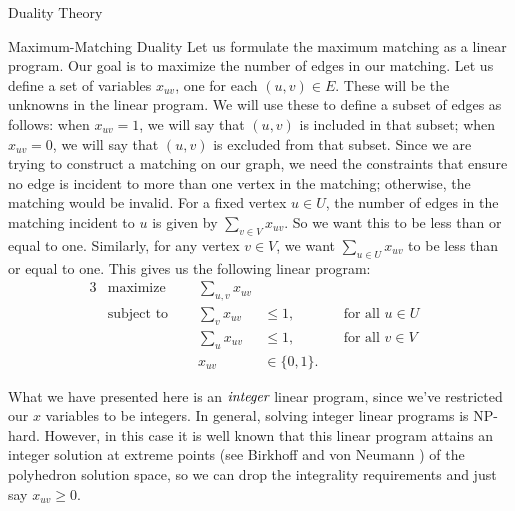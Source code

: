 \begin{section}{Duality Theory}
\begin{subsection}{Maximum-Matching Duality}
	Let us formulate the maximum matching as a linear program. Our goal is to maximize the number 
	of edges in our matching. Let us define a set of variables $x_{uv}$, one for each $(u,v)\in E$. 
	These will be the unknowns in the linear program. We will use these to define a subset of 
	edges as follows: when $x_{uv} = 1$, we will say that $(u,v)$ is included in that subset; 
	when $x_{uv} = 0$, we will say that $(u,v)$ is excluded from that subset. Since we are trying 
	to construct a matching on our graph, we need the constraints that ensure no edge is incident to 
	more than one vertex in the matching; otherwise, the matching would be invalid. For a fixed 
	vertex $u\in U$, the number of edges in the matching incident 
	to $u$ is given by $\sum_{v\in V} x_{uv}$. So we want this to be less than or equal to one. 
	Similarly, for any vertex $v\in V$, we want $\sum_{u\in U} x_{uv}$ to be less than or equal to 
	one. This gives us the following linear program:
	\begin{alignat}{3}
		& \text{maximize } & \sum_{u,v} x_{uv}& \\
		& \text{subject to } \quad & \sum_{v} x_{uv} & \leq 1, & \quad \text{for all } u\in U& \\
				     &\quad & \sum_{u} x_{uv} & \leq 1, & \quad \text{for all } v\in 
				     V & \\
				&& x_{uv} & \in \{0,1\}.
	\end{alignat}

	What we have presented here is an $\emph{integer}$ linear program, since we've restricted our 
	$x$ variables to be integers. In general, solving integer linear programs is NP-hard. However, 
	in this case it is well known that this linear program attains an integer solution at extreme 
	points
	(see Birkhoff \cite{birkhoff1946} and von Neumann \cite{vN53})
	of the polyhedron solution space, so we can drop the integrality requirements and just say 
	$x_{uv} \geq 0$.


\end{subsection}
\end{section}

